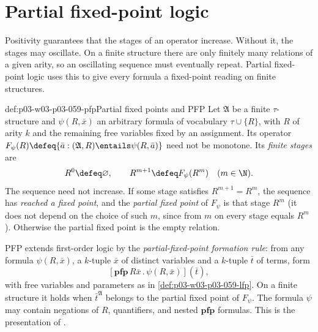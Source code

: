 \section{Partial fixed-point logic}
\label{sec:p03-w03-p03-059-pfp}

Positivity guarantees that the stages of an operator increase. Without it,
the stages may oscillate. On a finite structure there are only finitely
many relations of a given arity, so an oscillating sequence must eventually
repeat. Partial fixed-point logic uses this to give every formula a
fixed-point reading on finite structures.

\begin{hbdefinition}{def:p03-w03-p03-059-pfp}{Partial fixed points and PFP}
Let \(\mathfrak A\) be a finite \(\tau\)-structure and \(\psi(R,\bar x)\) an
arbitrary formula of vocabulary \(\tau\cup\{R\}\), with \(R\) of arity
\(k\) and the remaining free variables fixed by an assignment. Its operator
\(F_\psi(R)\defeq\{\bar a:(\mathfrak A,R)\entails\psi(R,\bar a)\}\) need not
be monotone. Its \emph{finite stages} are
\[
 R^0\defeq\varnothing,\qquad R^{m+1}\defeq F_\psi(R^m)\quad(m\in\N).
\]
The sequence need not increase. If some stage satisfies
\(R^{m+1}=R^m\), the sequence has \emph{reached a fixed point}, and the
\emph{partial fixed point} of \(F_\psi\) is that stage \(R^m\) (it does not
depend on the choice of such \(m\), since from \(m\) on every stage equals
\(R^m\)). Otherwise the partial fixed point is the empty relation.

PFP extends first-order logic by the \emph{partial-fixed-point formation
rule}: from any formula \(\psi(R,\bar x)\), a \(k\)-tuple \(\bar x\) of
distinct variables and a \(k\)-tuple \(\bar t\) of terms, form
\[
 [\mathbf{pfp}\,R\bar x\,.\,\psi(R,\bar x)](\bar t),
\]
with free variables and parameters as in \cref{def:p03-w03-p03-059-lfp}. On
a finite structure it holds when \(\bar t^{\mathfrak A}\) belongs to the
partial fixed point of \(F_\psi\). The formula \(\psi\) may contain
negations of \(R\), quantifiers, and nested \(\mathbf{pfp}\) formulas. This
is the presentation of \cite[p.~177]{Gradel2007FMTDescriptiveChapter}.
\end{hbdefinition}

